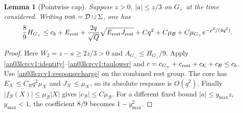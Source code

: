 \documentclass[11pt]{article}
\newtheorem{lemma}[theorem]{Lemma}
\theoremstyle{remark}\newtheorem{remark}[theorem]{Remark}
\newcommand{\Gp}{G_+}
\begin{document}
\begin{lemma}[Pointwise cap]
\label{an03lcrcv1:pointcap}
Suppose $z>0$, $|a|\le z/3$ on $\Gp$ at the time considered.
Writing ${\rm rest}=\mathcal D\cup\Sigma$, one has
\begin{equation}\label{an03lcrcv1:cap}
 \frac89 H_{\Gp}\le c_b+E_{\rm rest}
 +\frac{2q}{\sqrt Q}\sqrt{E_{\rm rest}J_{\rm rest}}
 +Cq^2+C\mu_{\mathcal B}
 +C\mu_{\Gp}e^{-\rho^2/(4q^2)}.
\end{equation}
\end{lemma}
\begin{proof}
Here $W_2=z-a\ge2z/3>0$ and $A_{\Gp}\le H_{\Gp}/9$.
Apply \eqref{an03lcrcv1:identity}--\eqref{an03lcrcv1:taulower}
and $c=c_{\Gp}+c_{\rm rest}+c_{\mathcal K}+c_{\mathcal B}\le c_b$.
Use \eqref{an03lcrcv1:responsecharge} on the combined rest group.
The core has $E_{\mathcal K}\le C_Rq^2\mu_{\mathcal K}$ and
$J_{\mathcal K}\le\mu_{\mathcal K}$, so its absolute response is
$O(q^2)$. Finally $|f_{\mathcal B}(X)|\le\mu_{\mathcal B}|X|$
gives $|c_{\mathcal B}|\le C\mu_{\mathcal B}$.
For a different fixed bound $|a|\le y_{\max}z$, $y_{\max}<1$,
the coefficient $8/9$ becomes $1-y_{\max}^2$.
\end{proof}
\end{document}
